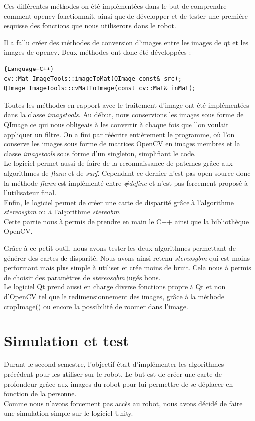 \documentclass[12pt,a4paper]{report}
\begin{document}
Ces différentes méthodes on été implémentées dans le but de comprendre comment opencv fonctionnait, ainsi que de développer et de tester une première esquisse des fonctions que nous utiliserons dans le robot.

Il a fallu créer des méthodes de conversion d'images entre les images de qt et les images de opencv. Deux méthodes ont donc été développées : 

\begin{lstlisting}{Language=C++}
cv::Mat ImageTools::imageToMat(QImage const& src);
QImage ImageTools::cvMatToImage(const cv::Mat& inMat);
\end{lstlisting}

Toutes les méthodes en rapport avec le traitement d'image ont été implémentées dans la classe \textit{imagetools}. Au début, nous conservions les images sous forme de QImage ce qui nous obligeais à les convertir à chaque fois que l'on voulait appliquer un filtre. On a fini par réécrire entièrement le programme, où l'on conserve les images sous forme de matrices OpenCV en images membres et la classe \textit{imagetools} sous forme d'un singleton, simplifiant le code.\\
Le logiciel permet aussi de faire de la reconnaissance de paternes grâce aux algorithmes de \textit{flann} et de \textit{surf}. Cependant ce dernier n'est pas open source donc la méthode \textit{flann} est implémenté entre \textit{\#define} et n'est pas forcement proposé à l'utilisateur final.\\
Enfin, le logiciel permet de créer une carte de disparité grâce à l'algorithme \textit{stereosgbm} ou à l'algorithme \textit{stereobm}.\\

Cette partie nous à permis de prendre en main le C++ ainsi que la bibliothèque OpenCV. 

Grâce à ce petit outil, nous avons tester les deux algorithmes permettant de générer des cartes de disparité. Nous avons ainsi retenu \textit{stereosgbm} qui est moins performant mais plus simple à utiliser et crée moins de bruit. Cela nous à permis de choisir des paramètres de \textit{stereosgbm} jugés bons.\\

Le logiciel Qt prend aussi en charge diverse fonctions propre à Qt et non d'OpenCV tel que le redimensionnement des images, grâce à la méthode cropImage() ou encore la possibilité de zoomer dans l'image.

\section{Simulation et test}
Durant le second semestre, l'objectif était d'implémenter les algorithmes précédent pour les utiliser sur le robot. Le but est de créer une carte de profondeur grâce aux images du robot pour lui permettre de se déplacer en fonction de la personne.\\
Comme nous n'avons forcement pas accès au robot, nous avons décidé de faire une simulation simple sur le logiciel Unity.\\
\end{document}
